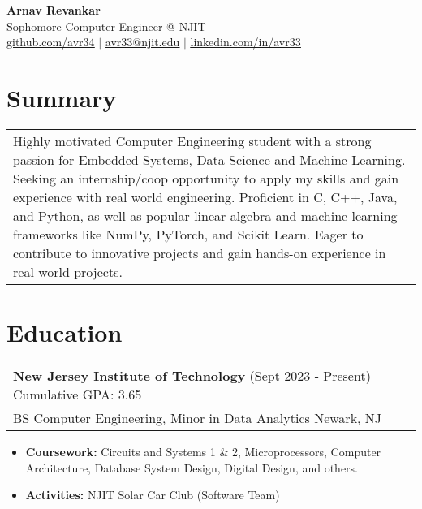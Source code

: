 \documentclass{article}
\newcommand{\underlinedLink}[2]{
    {\underline{\large \href{#1}{#2}}}
}
\begin{document}
\begin{spacing}{1.4}
    \begin{center}
        {\bf\Huge Arnav Revankar} \\
        {\large Sophomore Computer Engineer @ NJIT} \\
        \underlinedLink{https://github.com/BumpyTurtle127}{github.com/avr34} $|$ \underlinedLink{mailto:avr33@njit.edu}{avr33@njit.edu} $|$ \underlinedLink{https://linkedin.com/in/avr33}{linkedin.com/in/avr33}
    \end{center}
\end{spacing}
\vspace{-9pt}

\section{Summary}
    \begin{center}
        \begin{tabular}{p{}}
            Highly motivated Computer Engineering student with a strong passion for Embedded Systems, Data Science and Machine Learning. Seeking an internship/coop opportunity to apply my skills and gain experience with real world engineering. Proficient in C, C++, Java, and Python, as well as popular linear algebra and machine learning frameworks like NumPy, PyTorch, and Scikit Learn. Eager to contribute to innovative projects and gain hands-on experience in real world projects. \\
        \end{tabular}
    \end{center}

\section{Education}
    \vspace{-5pt}\begin{center}
        \begin{tabular}{p{}}
            {\large \bf New Jersey Institute of Technology} (Sept 2023 - Present) \hfill Cumulative GPA: 3.65 \\
            BS Computer Engineering, Minor in Data Analytics \hfill Newark, NJ
        \end{tabular}
    \end{center}
    \vspace{-10pt}\begin{itemize}
        \item {\bf Coursework:} Circuits and Systems 1 \& 2, Microprocessors, Computer Architecture, Database System Design, Digital Design, and others.
        \item {\bf Activities:} NJIT Solar Car Club (Software Team)
    \end{itemize}
\end{document}
